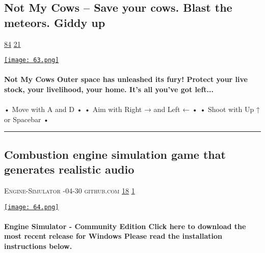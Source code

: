 \documentclass[10pt,a4paper]{article}
\begin{document}
\begin{multicols*}{2}
\begin{minipage}{\linewidth}
\subsection{Not My Cows – Save your cows. Blast the meteors. Giddy up}
\textsc{\footnotesize
{\scriptsize\faThumbsOUp}\space 
\href{http://news.ycombinator.com/item?id=37164650\&utm\_term=comment}{84} 
{\scriptsize\faComments}\space 
\href{http://news.ycombinator.com/item?id=37164650\&utm\_term=comment}{21} 
}
\par\medskip\noindent
\href{https://notmycows.com/?utm\_source=hackernewsletter\&utm\_medium=email\&utm\_term=fun}{
    \texttt{[image: 63.png]}
}
\end{minipage}
\paragraph{}
\textbf{Not My Cows
Outer space has unleashed its fury! Protect your live stock, your livelihood, your home. It's all you've got left...}
\paragraph{}

• Move with A and D •
• Aim with Right → and Left ← •
• Shoot with Up ↑ or Spacebar •
\par\noindent\textcolor{red}{\rule{\linewidth}{0.2mm}}
\vfill
\null
\noindent\begin{minipage}{\linewidth}
\subsection{Combustion engine simulation game that generates realistic audio}
\textsc{\footnotesize
{\scriptsize\faUser}\space 
Engine-Simulator 
{\scriptsize\faCalendar}-04-30 
{\scriptsize\faGithub}\space 
github.com 
{\scriptsize\faThumbsOUp}\space 
\href{http://news.ycombinator.com/item?id=37173555\&utm\_term=comment}{18} 
{\scriptsize\faComments}\space 
\href{http://news.ycombinator.com/item?id=37173555\&utm\_term=comment}{1} 
}
\par\medskip\noindent
\href{https://github.com/Engine-Simulator/engine-sim-community-edition?utm\_source=hackernewsletter\&utm\_medium=email\&utm\_term=fun}{
    \texttt{[image: 64.png]}
}
\end{minipage}
\paragraph{}
\textbf{Engine Simulator - Community Edition
Click here to download the most recent release for Windows
Please read the installation instructions below.}

\end{multicols*}
\end{document}
